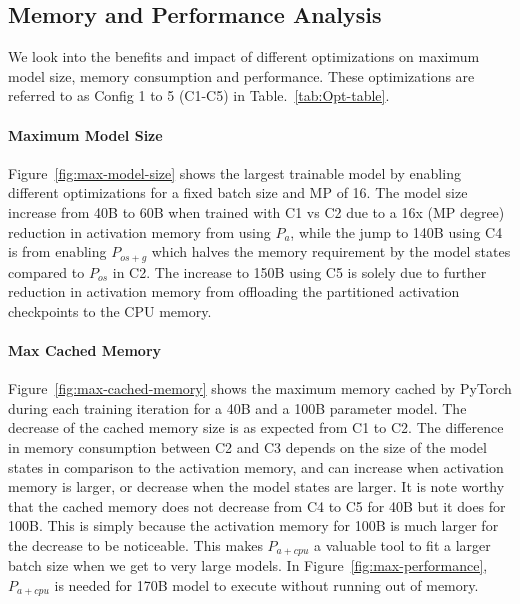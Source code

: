 
\subsection{Memory and Performance Analysis}
We look into the benefits and impact of different optimizations on maximum model size, memory consumption and performance. These optimizations are referred to as Config 1 to 5 (C1-C5) in Table.~\ref{tab:Opt-table}.

\paragraph{Maximum Model Size}
Figure~\ref{fig:max-model-size} shows the largest trainable model by enabling different \name optimizations for a fixed batch size and MP of 16. The model size increase from 40B to 60B when trained with C1 vs C2  due to a 16x (MP degree) reduction in activation memory from using $P_a$, while the jump to 140B using C4 is from enabling $P_{os+g}$ which halves the memory requirement by the model states compared to $P_{os}$ in C2. The increase to 150B using C5 is solely due to further reduction in activation memory from offloading the partitioned activation checkpoints to the CPU memory.
\paragraph{Max Cached Memory}
Figure~\ref{fig:max-cached-memory} shows the maximum memory cached by PyTorch during each training iteration for a 40B and a 100B parameter model. The decrease of the cached memory size is as expected from C1 to C2. The difference in memory consumption between C2 and C3 depends on the size of the model states in comparison to the activation memory, and can increase when activation memory is larger, or decrease when the model states are larger. It is note worthy that the cached memory does not decrease from C4 to C5 for 40B but it does for 100B. This is simply because the activation memory for 100B is much larger for the decrease to be noticeable. This makes $P_{a+cpu}$ a valuable tool to fit a larger batch size when we get to very large models. In Figure~\ref{fig:max-performance}, $P_{a+cpu}$ is needed for 170B model to execute without running out of memory.

